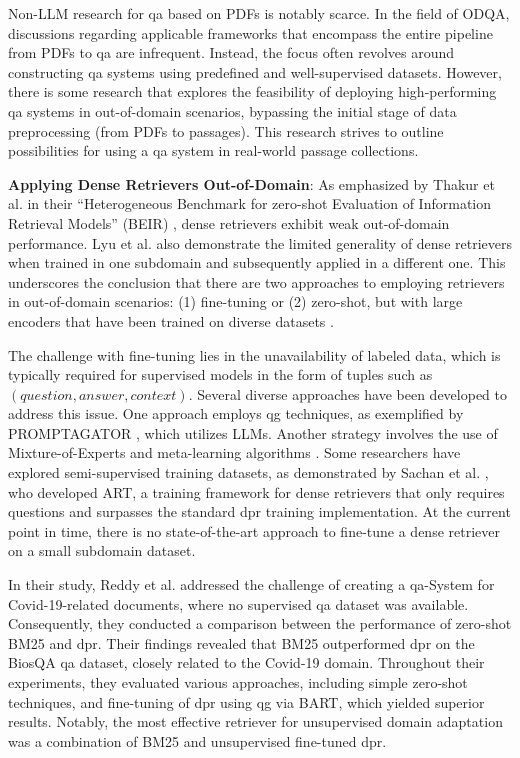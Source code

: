 Non-LLM research for \gls{qa} based on PDFs is notably scarce. In the field of ODQA, discussions regarding applicable frameworks that encompass the entire pipeline from PDFs to \gls{qa} are infrequent. Instead, the focus often revolves around constructing \gls{qa} systems using predefined and well-supervised datasets. However, there is some research that explores the feasibility of deploying high-performing \gls{qa} systems in out-of-domain scenarios, bypassing the initial stage of data preprocessing (from PDFs to passages). This research strives to outline possibilities for using a \gls{qa} system in real-world passage collections.

\noindent \textbf{Applying Dense Retrievers Out-of-Domain}: As emphasized by Thakur et al. in their \enquote{Heterogeneous Benchmark for zero-shot Evaluation of Information Retrieval Models} (BEIR) \cite{thakur_beir_2021}, dense retrievers exhibit weak out-of-domain performance. Lyu et al. \cite{farea_evaluation_2022} also demonstrate the limited generality of dense retrievers when trained in one subdomain and subsequently applied in a different one. This underscores the conclusion that there are two approaches to employing retrievers in out-of-domain scenarios: (1) fine-tuning or (2) zero-shot, but with large encoders that have been trained on diverse datasets \cite{ni_large_2021}.

The challenge with fine-tuning lies in the unavailability of labeled data, which is typically required for supervised models in the form of tuples such as $(question,\allowbreak answer,\allowbreak context)$. Several diverse approaches have been developed to address this issue. One approach employs \gls{qg} techniques, as exemplified by PROMPTAGATOR \cite{dai_promptagator_2022}, which utilizes LLMs. Another strategy involves the use of Mixture-of-Experts and meta-learning algorithms \cite{chen_improving_2021}. Some researchers have explored semi-supervised training datasets, as demonstrated by Sachan et al. \cite{sachan_questions_2023}, who developed ART, a training framework for dense retrievers that only requires questions and surpasses the standard \gls{dpr} training implementation. At the current point in time, there is no state-of-the-art approach to fine-tune a dense retriever on a small subdomain dataset.

In their study, Reddy et al. \cite{reddy_synthetic_2022} addressed the challenge of creating a \gls{qa}-System for Covid-19-related documents, where no supervised \gls{qa} dataset was available. Consequently, they conducted a comparison between the performance of zero-shot BM25 and \gls{dpr}. Their findings revealed that BM25 outperformed \gls{dpr} on the BiosQA \gls{qa} dataset, closely related to the Covid-19 domain. Throughout their experiments, they evaluated various approaches, including simple zero-shot techniques, and fine-tuning of \gls{dpr} using \gls{qg} via BART, which yielded superior results. Notably, the most effective retriever for unsupervised domain adaptation was a combination of BM25 and unsupervised fine-tuned \gls{dpr}.

